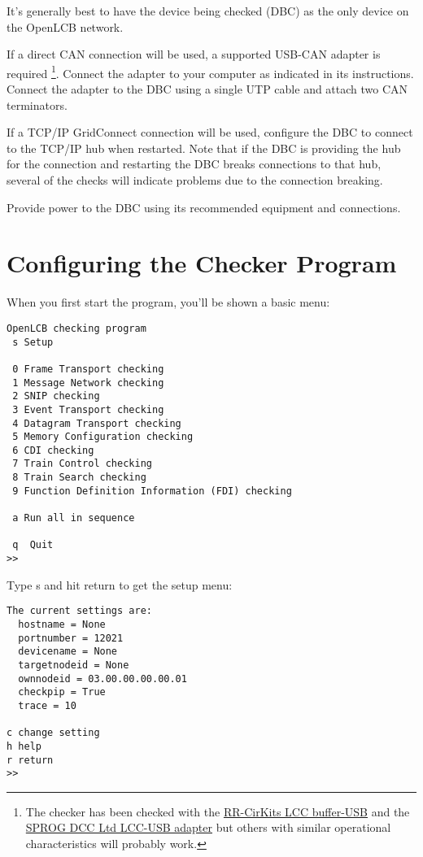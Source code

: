 It's generally best to have the device being checked (DBC)
as the only device on the OpenLCB network.

If a direct CAN connection will be used,
a supported USB-CAN adapter is required
\footnote{The checker has been checked with the
\href{https://www.rr-cirkits.com/description/LCC-usb-flyer.pdf}{RR-CirKits LCC buffer-USB}
and the \href{https://www.sprog-dcc.co.uk/lcc-start-page}{SPROG DCC Ltd LCC-USB adapter}
but others with similar operational characteristics will probably work.
}.
Connect the adapter to your computer as indicated in its instructions.
Connect the adapter to the DBC using a single UTP cable
and attach two CAN terminators.

If a TCP/IP GridConnect connection will be used,
configure the DBC to connect to the TCP/IP hub when restarted. Note that if
the DBC is providing the hub for the connection and restarting the DBC
breaks connections to that hub, several of the checks will indicate problems
due to the connection breaking.

Provide power to the DBC using its recommended equipment and connections.

\section{Configuring the Checker Program}

When you first start the program, you'll be shown a basic menu:

\begin{verbatim}
OpenLCB checking program
 s Setup

 0 Frame Transport checking
 1 Message Network checking
 2 SNIP checking
 3 Event Transport checking
 4 Datagram Transport checking
 5 Memory Configuration checking
 6 CDI checking
 7 Train Control checking
 8 Train Search checking
 9 Function Definition Information (FDI) checking
  
 a Run all in sequence

 q  Quit
>>
\end{verbatim}

Type s and hit return to get the setup menu:

\begin{verbatim}
The current settings are:
  hostname = None
  portnumber = 12021
  devicename = None
  targetnodeid = None
  ownnodeid = 03.00.00.00.00.01
  checkpip = True
  trace = 10

c change setting
h help
r return
>>
\end{verbatim}

